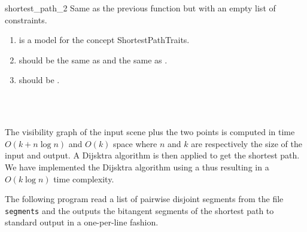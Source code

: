 \begin{ccRefFunction}{shortest_path_2}
{
Same as the previous function but with an empty list of constraints.
}

\begin{enumerate}
    \item {} is a model for the concept ShortestPathTraits.
    \item {} should be the same as
     and the same as
    .
    \item {} should be .
\end{enumerate}

\ccSeeAlso

 \\
 \\

\ccImplementation

The visibility graph of the input scene plus the two points is computed in time
$O(k + n \log n)$ and $O(k)$ space where $n$ and $k$ are respectively the size
of the input and output.
A Dijsktra algorithm is then applied to get the shortest path. We have
implemented the Dijsktra algorithm using a  thus resulting in a
$O(k \log n)$ time complexity.

\ccExample

The following program read a list of pairwise disjoint segments from the file
\texttt{segments} and the outputs the bitangent segments of the shortest path to
standard output in a one-per-line fashion.


\ccTagDefaults
\end{ccRefFunction}
\ccRefPageEnd
